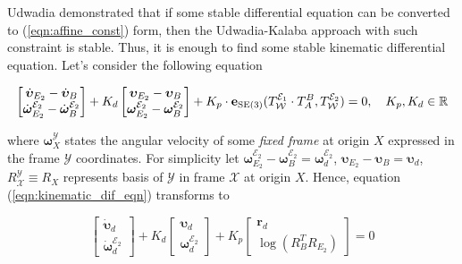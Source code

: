 Udwadia \cite{udwadia1996analytical} demonstrated that if some stable differential 
equation can be converted to (\ref{eqn:affine_const}) form, then the Udwadia-Kalaba 
approach with such constraint is stable. Thus, it is enough to find some stable 
kinematic differential equation. Let's consider the following equation 

\begin{equation}
    \begin{bmatrix}
        \dot{\boldsymbol{\upsilon}}_{E_2} - \dot{\boldsymbol{\upsilon}}_B \\
        \dot{\boldsymbol{\omega}}_{E_2}^{\mathcal{E}_2} - 
        \dot{\boldsymbol{\omega}}_B^{\mathcal{E}_2}
    \end{bmatrix} 
    + K_d 
    \begin{bmatrix}
        \boldsymbol{\upsilon}_{E_2} - \boldsymbol{\upsilon}_B \\
        \boldsymbol{\omega}_{E_2}^{\mathcal{E}_2} - 
        \boldsymbol{\omega}_B^{\mathcal{E}_2}
    \end{bmatrix}
    + K_p \cdot
    \mathbf{e}_{\text{SE}(3)}(
        T_{\mathcal{W}}^{\mathcal{E}_1} \cdot
        T_{A}^{B},
        T_{\mathcal{W}}^{\mathcal{E}_2}
    ) = 0, \quad 
    K_p, K_d \in \mathbb{R}
    \label{eqn:kinematic_dif_eqn}
\end{equation}

where $\boldsymbol{\omega}_X^{\mathcal{Y}}$ states the angular velocity of some 
\emph{fixed frame} at origin $X$ expressed in the frame $\mathcal{Y}$ coordinates.  
For simplicity let $\boldsymbol{\omega}_{E_2}^{\mathcal{E}_2} - 
\boldsymbol{\omega}_B^{\mathcal{E}_2} = \boldsymbol{\omega}_d^{\mathcal{E}_2}$, 
$\boldsymbol{\upsilon}_{E_2} - \boldsymbol{\upsilon}_B = \boldsymbol{\upsilon}_d$, 
$R_{\mathcal{X}}^{\mathcal{Y}} \equiv R_X$ represents basis of $\mathcal{Y}$ in 
frame $\mathcal{X}$ at origin $X$. Hence, equation (\ref{eqn:kinematic_dif_eqn}) 
transforms to 

\begin{equation}
    \begin{bmatrix}
        \dot{\boldsymbol{\upsilon}}_d \\
        \dot{\boldsymbol{\omega}}_d^{\mathcal{E}_2}
    \end{bmatrix}
    + K_d
    \begin{bmatrix}
        \boldsymbol{\upsilon}_d \\
        \boldsymbol{\omega}_d^{\mathcal{E}_2}
    \end{bmatrix}
    + K_p
    \begin{bmatrix}
        \mathbf{r}_d \\
        \log (R_B^T R_{E_2})
    \end{bmatrix}
    = 0
    \label{eqn:kinematic_dif_eqn_simple}
\end{equation}

